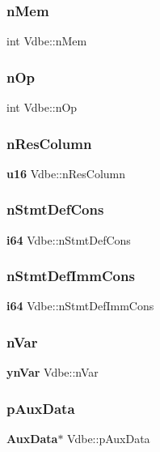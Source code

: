 \subsubsection{nMem}
{\footnotesize\ttfamily int Vdbe\+::n\+Mem}

\mbox{\label{struct_vdbe_a81e72e6812c71e13651f81cc3a6ca1d0}} 
\subsubsection{nOp}
{\footnotesize\ttfamily int Vdbe\+::n\+Op}

\mbox{\label{struct_vdbe_a525830c709542b280d11c764e9a9994a}} 
\subsubsection{nResColumn}
{\footnotesize\ttfamily \textbf{ u16} Vdbe\+::n\+Res\+Column}

\mbox{\label{struct_vdbe_ab6a710cd4796c6adc8967e7b5bf35757}} 
\subsubsection{nStmtDefCons}
{\footnotesize\ttfamily \textbf{ i64} Vdbe\+::n\+Stmt\+Def\+Cons}

\mbox{\label{struct_vdbe_acc12695377eb8b25107876145704c496}} 
\subsubsection{nStmtDefImmCons}
{\footnotesize\ttfamily \textbf{ i64} Vdbe\+::n\+Stmt\+Def\+Imm\+Cons}

\mbox{\label{struct_vdbe_a2acd8f1fa65e19eb48fc62ddb6cb7569}} 
\subsubsection{nVar}
{\footnotesize\ttfamily \textbf{ yn\+Var} Vdbe\+::n\+Var}

\mbox{\label{struct_vdbe_a43c515d3521658be7f7e33e4eb2aa136}} 
\subsubsection{pAuxData}
{\footnotesize\ttfamily \textbf{ Aux\+Data}$\ast$ Vdbe\+::p\+Aux\+Data}


